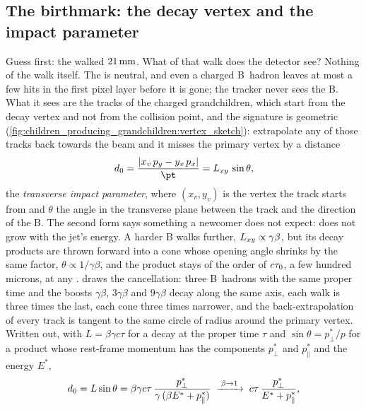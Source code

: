 \subsection{The birthmark: the decay vertex and the impact parameter}
\label{sec:children_producing_grandchildren:vertices}

Guess first: the \Bbar walked $21\,\mathrm{mm}$. What of that walk does the detector
see? Nothing of the walk itself. The \Bbar is neutral, and even a charged
B~hadron leaves at most a few hits in the first pixel layer before it is
gone; the tracker never sees the B. What it sees are the tracks of the
charged grandchildren, which start from the decay vertex and not from the
collision point, and the signature is geometric
(\cref{fig:children_producing_grandchildren:vertex_sketch}): extrapolate
any of those tracks back towards the beam and it misses the primary vertex
by a distance
\begin{equation}
  \dzero=\frac{|x_v\,p_y-y_v\,p_x|}{\pt}=\Lxy\,\sin\theta,
  \label{eq:children_producing_grandchildren:d0}
\end{equation}
the \emph{transverse impact parameter}, where $(x_v,y_v)$ is the vertex
the track starts from and $\theta$ the angle in the transverse plane
between the track and the direction of the B. The second form says
something a newcomer does not expect: \dzero does not grow with the jet's
energy. A harder B walks further, $L_{xy}\propto\gamma\beta$, but its
decay products are thrown forward into a cone whose opening angle shrinks
by the same factor, $\theta\propto1/\gamma\beta$, and the product stays of
the order of $c\tau_0$, a few hundred microns, at any \pt.
 draws the
cancellation: three B~hadrons with the same proper time and the boosts
$\gamma\beta$, $3\gamma\beta$ and $9\gamma\beta$ decay along the same
axis, each walk is three times the last, each cone three times narrower,
and the back-extrapolation of every track is tangent to the same circle
of radius \dzero around the primary vertex. Written out, with
$L=\beta\gamma c\tau$ for a decay at the proper time $\tau$ and
$\sin\theta=p^*_\perp/p$ for a product whose rest-frame momentum has the
components $p^*_\perp$ and $p^*_\parallel$ and the energy $E^*$,
\begin{equation}
  d_0=L\sin\theta
  =\beta\gamma c\tau\,\frac{p^*_\perp}{\gamma\,(\beta E^*+p^*_\parallel)}
  \;\xrightarrow{\;\beta\to1\;}\;
  c\tau\,\frac{p^*_\perp}{E^*+p^*_\parallel},
  \label{eq:children_producing_grandchildren:d0boost}
\end{equation}
